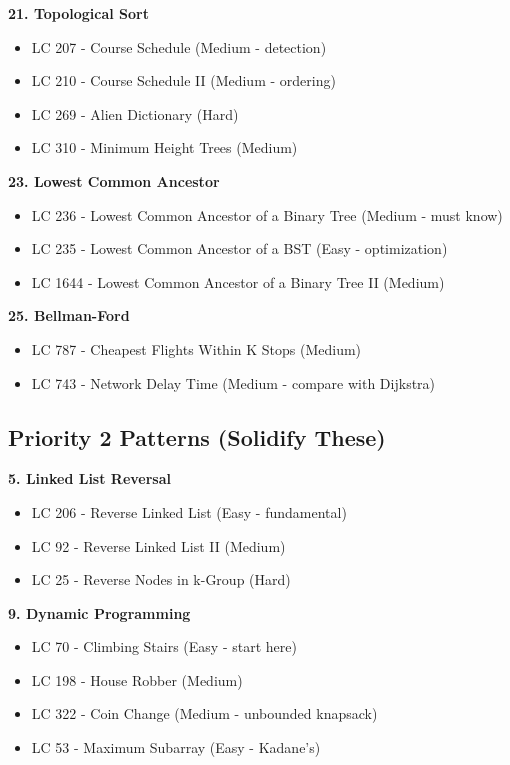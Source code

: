 \documentclass[10pt]{article}
\begin{document}
\textbf{21. Topological Sort}
\begin{itemize}
\item LC 207 - Course Schedule (Medium - detection)
\item LC 210 - Course Schedule II (Medium - ordering)
\item LC 269 - Alien Dictionary (Hard)
\item LC 310 - Minimum Height Trees (Medium)
\end{itemize}

\textbf{23. Lowest Common Ancestor}
\begin{itemize}
\item LC 236 - Lowest Common Ancestor of a Binary Tree (Medium - must know)
\item LC 235 - Lowest Common Ancestor of a BST (Easy - optimization)
\item LC 1644 - Lowest Common Ancestor of a Binary Tree II (Medium)
\end{itemize}

\textbf{25. Bellman-Ford}
\begin{itemize}
\item LC 787 - Cheapest Flights Within K Stops (Medium)
\item LC 743 - Network Delay Time (Medium - compare with Dijkstra)
\end{itemize}

\subsection{Priority 2 Patterns (Solidify These)}

\textbf{5. Linked List Reversal}
\begin{itemize}
\item LC 206 - Reverse Linked List (Easy - fundamental)
\item LC 92 - Reverse Linked List II (Medium)
\item LC 25 - Reverse Nodes in k-Group (Hard)
\end{itemize}

\textbf{9. Dynamic Programming}
\begin{itemize}
\item LC 70 - Climbing Stairs (Easy - start here)
\item LC 198 - House Robber (Medium)
\item LC 322 - Coin Change (Medium - unbounded knapsack)
\item LC 53 - Maximum Subarray (Easy - Kadane's)
\end{itemize}
\end{document}
